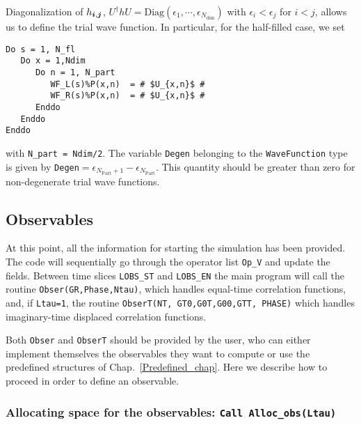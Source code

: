 Diagonalization  of  $ h_{\boldsymbol{i},\boldsymbol{j}}$,      $U^{\dagger} h  U  = \mathrm{Diag} \left(   \epsilon_1, \cdots, \epsilon_{N_{\mathrm{dim}}} \right) $     with  $\epsilon_i  <  \epsilon_j $  for $i < j$, allows us  to define the  trial wave function.  In particular, for the half-filled case, we set 
\begin{lstlisting}[style=fortran,escapechar=\#]
Do s = 1, N_fl
   Do x = 1,Ndim
      Do n = 1, N_part
         WF_L(s)%P(x,n)  = # $U_{x,n}$ #
         WF_R(s)%P(x,n)  = # $U_{x,n}$ #
      Enddo
   Enddo
Enddo
\end{lstlisting}
with \texttt{N\_part = Ndim/2}.     The  variable \texttt{Degen}   belonging to the \texttt{WaveFunction}  type  is given by  \texttt{Degen}$=\epsilon_{N_{\mathrm{Part}} +1 } - \epsilon_{N_{\mathrm{Part}}  }$.   This quantity should be greater than zero  for non-degenerate trial wave functions. 

\subsection{Observables}

At this point, all the information for starting the simulation has been provided.  The code will sequentially go through  the operator list  \texttt{Op\_V}  and update the  fields.  Between  time slices  \texttt{LOBS\_ST}  and  \texttt{LOBS\_EN} the main program will call the routine  \texttt{Obser(GR,Phase,Ntau)}, which handles equal-time correlation functions, and, if \texttt{Ltau=1}, the routine \texttt{ObserT(NT,  GT0,G0T,G00,GTT, PHASE)} which handles imaginary-time displaced correlation functions. 

Both \texttt{Obser} and \texttt{ObserT} should be provided by the user, who can either implement themselves the observables they want to compute or use the predefined structures of Chap.~\ref{Predefined_chap}. Here we describe how to proceed in order to define an observable. 

\subsubsection{Allocating space for the observables: \texttt{Call Alloc\_obs(Ltau) }} \label{Alloc_obs_sec}

